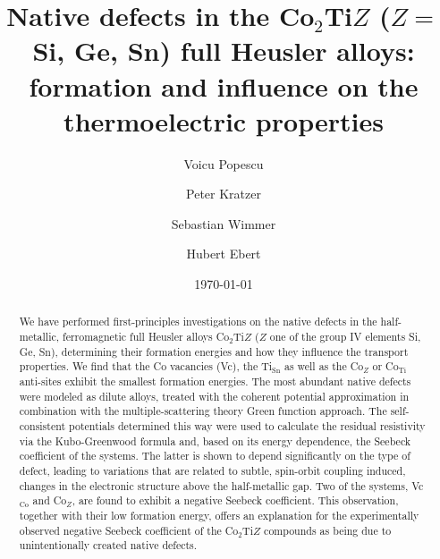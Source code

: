 \documentclass[aps,prb,twocolumn,superscriptaddress,showpacs]{revtex4}
\newcommand{\bm}[1]{\mbox{\boldmath$#1$}}
\begin{document}
\title{Native defects in the 
  Co$_2$Ti\bm{Z} (\bm{Z=} Si, Ge, Sn) full Heusler alloys: formation
  and influence on the thermoelectric properties}
\author{Voicu Popescu}
\author{Peter Kratzer}
\author{Sebastian Wimmer}
\author{Hubert Ebert}

\date{\today}

\begin{abstract}
We have performed first-principles investigations on
the native defects in the half-metallic, ferromagnetic
full Heusler alloys Co$_2$Ti$Z$
($Z$ one of the group IV elements Si, Ge, Sn),
determining their formation energies and how
they influence the transport properties. 
We find that the Co vacancies (Vc),
the Ti$_\text{Sn}$ as well as the
Co$_Z$ or Co$_\text{Ti}$ anti-sites exhibit the 
smallest formation energies.
The most abundant native defects
were modeled as dilute alloys, treated with the 
coherent potential approximation in combination
with the multiple-scattering theory Green function approach. 
The self-consistent potentials determined this way were
used to calculate the residual resistivity via the
Kubo-Greenwood formula and, based on its energy dependence,
the Seebeck coefficient of the systems. The latter is shown
to depend significantly on the type of
defect, leading to variations that are related to
subtle, spin-orbit coupling induced,
changes in the electronic structure above
the half-metallic gap. Two of the systems, Vc$_\text{Co}$ 
and Co$_Z$, are found to exhibit a negative Seebeck coefficient.
This observation, together with their low formation energy,
offers an explanation for the experimentally 
observed negative Seebeck coefficient 
of the Co$_2$Ti$Z$ compounds as being due to 
unintentionally created native defects.
\end{abstract}
\maketitle
\end{document}
